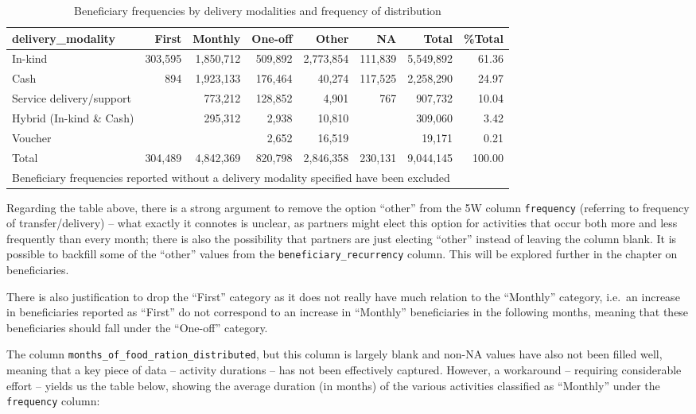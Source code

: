 \documentclass[
]{article}
\begin{document}
\begin{table}

\caption{\label{tab:table-modality-frequency}Beneficiary frequencies by delivery modalities and frequency of distribution}
\centering
\begin{tabular}[t]{l|r|r|r|r|r|r|r}
\hline
delivery\_modality & First & Monthly & One-off & Other & NA & Total & \%Total\\
\hline
In-kind & 303,595 & 1,850,712 & 509,892 & 2,773,854 & 111,839 & 5,549,892 & 61.36\\
\hline
Cash & 894 & 1,923,133 & 176,464 & 40,274 & 117,525 & 2,258,290 & 24.97\\
\hline
Service delivery/support &  & 773,212 & 128,852 & 4,901 & 767 & 907,732 & 10.04\\
\hline
Hybrid (In-kind \& Cash) &  & 295,312 & 2,938 & 10,810 &  & 309,060 & 3.42\\
\hline
Voucher &  &  & 2,652 & 16,519 &  & 19,171 & 0.21\\
\hline
Total & 304,489 & 4,842,369 & 820,798 & 2,846,358 & 230,131 & 9,044,145 & 100.00\\
\hline
\multicolumn{8}{l}{\rule{0pt}{1em}Beneficiary frequencies reported without a delivery modality specified have been excluded}\\
\end{tabular}
\end{table}

Regarding the table above, there is a strong argument to remove the
option ``other'' from the 5W column \texttt{frequency} (referring to
frequency of transfer/delivery) -- what exactly it connotes is unclear,
as partners might elect this option for activities that occur both more
and less frequently than every month; there is also the possibility that
partners are just electing ``other'' instead of leaving the column
blank. It is possible to backfill some of the ``other'' values from the
\texttt{beneficiary\_recurrency} column. This will be explored further
in the chapter on beneficiaries.

There is also justification to drop the ``First'' category as it does
not really have much relation to the ``Monthly'' category, i.e.~an
increase in beneficiaries reported as ``First'' do not correspond to an
increase in ``Monthly'' beneficiaries in the following months, meaning
that these beneficiaries should fall under the ``One-off'' category.

The column \texttt{months\_of\_food\_ration\_distributed}, but this
column is largely blank and non-NA values have also not been filled
well, meaning that a key piece of data -- activity durations -- has not
been effectively captured. However, a workaround -- requiring
considerable effort -- yields us the table below, showing the average
duration (in months) of the various activities classified as ``Monthly''
under the \texttt{frequency} column:
\end{document}
